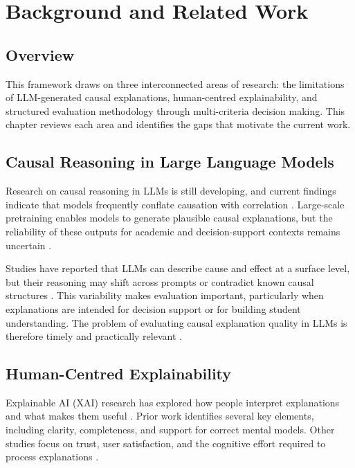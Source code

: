 \chapter{Background and Related Work}
\label{ch:literature}

\section{Overview}
\label{sec:lit-overview}

This framework draws on three interconnected areas of research: the limitations of
LLM-generated causal explanations, human-centred explainability, and structured
evaluation methodology through multi-criteria decision making. This chapter reviews
each area and identifies the gaps that motivate the current work.

\section{Causal Reasoning in Large Language Models}
\label{sec:lit-causal}

Research on causal reasoning in LLMs is still developing, and current findings
indicate that models frequently conflate causation with correlation
\citep{jin2024llm, wu2024causality}. Large-scale pretraining enables models to
generate plausible causal explanations, but the reliability of these outputs for
academic and decision-support contexts remains uncertain \citep{kiciman2024causal}.

Studies have reported that LLMs can describe cause and effect at a surface level,
but their reasoning may shift across prompts or contradict known causal structures
\citep{miliani2026explica}. This variability makes evaluation important, particularly
when explanations are intended for decision support or for building student
understanding. The problem of evaluating causal explanation quality in LLMs is
therefore timely and practically relevant \citep{lin2024criticbench}.

\section{Human-Centred Explainability}
\label{sec:lit-xai}

Explainable AI (XAI) research has explored how people interpret explanations and
what makes them useful \citep{ehsan2020human, boydgraber2022human}. Prior work
identifies several key elements, including clarity, completeness, and support for
correct mental models. Other studies focus on trust, user satisfaction, and the
cognitive effort required to process explanations \citep{hoffman2019metrics}.

